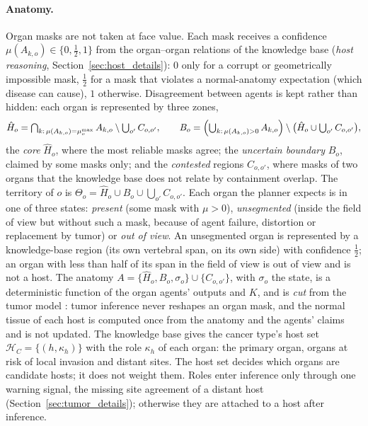 \documentclass[fleqn,10pt]{olplainarticle}
\begin{document}
\paragraph{Anatomy.}
Organ masks are not taken at face value. Each mask receives a confidence $\mu(A_{k,o})\in\{0,\tfrac12,1\}$ from the
organ--organ relations of the knowledge base (\emph{host reasoning}, Section~\ref{sec:host_details}): $0$ only for a corrupt or geometrically
impossible mask, $\tfrac12$ for a mask that violates a normal-anatomy expectation (which disease can cause), $1$
otherwise. Disagreement between agents is kept rather than hidden: each organ is represented by three zones,
\begin{equation}
\label{eq:organ_reference}
\hat H_o=\textstyle\bigcap_{k:\,\mu(A_{k,o})=\mu^{\max}_o}A_{k,o}\setminus\bigcup_{o'}C_{o,o'},\qquad
B_o=\Bigl(\textstyle\bigcup_{k:\,\mu(A_{k,o})>0}A_{k,o}\Bigr)\setminus\bigl(\hat H_o\cup\textstyle\bigcup_{o'}C_{o,o'}\bigr),
\end{equation}
the \emph{core} $\hat H_o$, where the most reliable masks agree; the \emph{uncertain boundary} $B_o$, claimed by some
masks only; and the \emph{contested} regions $C_{o,o'}$, where masks of two organs that the knowledge base does not relate
by containment overlap. The territory of $o$ is $\Theta_o=\hat H_o\cup B_o\cup\bigcup_{o'}C_{o,o'}$. Each organ the
planner expects is in one of three states: \emph{present} (some mask with $\mu>0$), \emph{unsegmented} (inside the field
of view but without such a mask, because of agent failure, distortion or replacement by tumor) or \emph{out of view}. An
unsegmented organ is represented by a knowledge-base region (its own vertebral span, on its own side) with confidence
$\tfrac12$; an organ with less than half of its span in the field of view is out of view and is not a host. The anatomy $A=\{\hat H_o,B_o,\sigma_o\}\cup\{C_{o,o'}\}$, with $\sigma_o$ the
state, is a deterministic function of the organ agents' outputs and $K$, and is \emph{cut} from the tumor model
\cite{liu2009modularization,plummer2015cuts,jacob2017better}: tumor inference never reshapes an organ mask, and the normal
tissue of each host is computed once from the anatomy and the agents' claims and is not updated. The knowledge base
gives the cancer type's host set $\mathcal{H}_C=\{(h,\kappa_h)\}$ with the role $\kappa_h$ of each organ: the primary organ,
organs at risk of local invasion and distant sites. The host set decides which organs are candidate hosts; it does not
weight them. Roles enter inference only through one warning signal, the missing site agreement of a distant host
(Section~\ref{sec:tumor_details}); otherwise they are attached to a host after inference.
\end{document}

